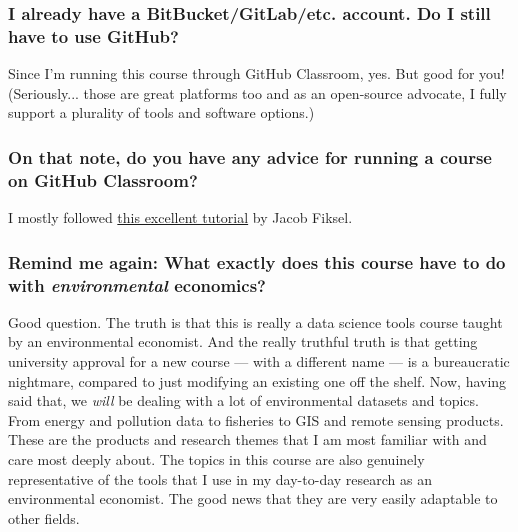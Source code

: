 \documentclass[12]{article}
\begin{document}
\vspace{-0.25cm}
\subsubsection*{I already have a BitBucket/GitLab/etc. account. Do I still have to use GitHub?}
Since I'm running this course through GitHub Classroom, yes. But good for you! (Seriously... those are great platforms too and as an open-source advocate, I fully support a plurality of tools and software options.)

\vspace{-0.25cm}
\subsubsection*{On that note, do you have any advice for running a course on GitHub Classroom?}
I mostly followed \href{https://github.com/jfiksel/github-classroom-for-teachers}{this excellent tutorial} by Jacob Fiksel.

\vspace{-0.25cm}
\subsubsection*{Remind me again: What exactly does this course have to do with \textit{environmental} economics?}
Good question. The truth is that this is really a data science tools course taught by an environmental economist. And the really truthful truth is that getting university approval for a new course --- with a different name --- is a bureaucratic nightmare, compared to just modifying an existing one off the shelf. Now, having said that, we \textit{will} be dealing with a lot of environmental datasets and topics. From energy and pollution data to fisheries to GIS and remote sensing products. These are the products and research themes that I am most familiar with and care most deeply about. The topics in this course are also genuinely representative of the tools that I use in my day-to-day research as an environmental economist. The good news that they are very easily adaptable to other fields.
\end{document}
